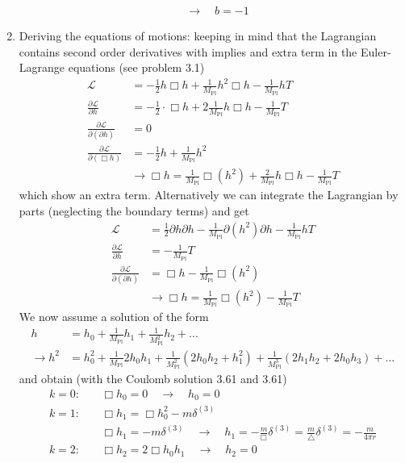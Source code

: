 \documentclass[10pt,a4paper]{book}
\theoremstyle{definition}
\begin{document}
\begin{enumerate}[label=(\alph*)]
\begin{align}
&\rightarrow\quad b=-1
\end{align} 
\item Deriving the equations of motions: keeping in mind that the Lagrangian contains second order derivatives with implies and extra term in the Euler-Lagrange equations (see problem 3.1)
\begin{align}
\mathcal{L}&=-\frac{1}{2}h\Box h+\frac{1}{M_\text{Pl}}h^2\Box h-\frac{1}{M_\text{Pl}}hT\\
\frac{\partial\mathcal{L}}{\partial h}&=-\frac{1}{2}\cdot\Box h+2\frac{1}{M_\text{Pl}}h\Box h-\frac{1}{M_\text{Pl}}T\\
\frac{\partial\mathcal{L}}{\partial(\partial h)}&=0\\
\frac{\partial\mathcal{L}}{\partial(\Box h)}&=-\frac{1}{2}h+\frac{1}{M_\text{Pl}}h^2\\
&\rightarrow\Box h=\frac{1}{M_\text{Pl}}\Box(h^2)+\frac{2}{M_\text{Pl}}h\Box h-\frac{1}{M_\text{Pl}}T
\end{align}
which show an extra term. Alternatively we can integrate the Lagrangian by parts (neglecting the boundary terms) and get
\begin{align}
\mathcal{L}&=\frac{1}{2}\partial h\partial h-\frac{1}{M_\text{Pl}}\partial(h^2)\partial h-\frac{1}{M_\text{Pl}}hT\\
\frac{\partial\mathcal{L}}{\partial h}&=-\frac{1}{M_\text{Pl}}T\\
\frac{\partial\mathcal{L}}{\partial(\partial h)}&=\Box h-\frac{1}{M_\text{Pl}}\Box(h^2)\\
&\rightarrow\Box h=\frac{1}{M_\text{Pl}}\Box(h^2)-\frac{1}{M_\text{Pl}}T
\end{align}
We now assume a solution of the form
\begin{align}
h&=h_0+\frac{1}{M_\text{Pl}}h_1+\frac{1}{M_\text{Pl}^2}h_2+...\\
\rightarrow h^2&=h_0^2+\frac{1}{M_\text{Pl}}2h_0h_1+\frac{1}{M_\text{Pl}^2}(2h_0h_2+h_1^2)+\frac{1}{M_\text{Pl}^3}(2h_1h_2+2h_0h_3)+...
\end{align}
and obtain (with the Coulomb solution 3.61 and 3.61)
\begin{align}
k=0:&\quad\Box h_0=0\quad\rightarrow\quad h_0=0\\
k=1:&\quad\Box h_1=\Box h_0^2-m\delta^{(3)}\\
    &\quad\Box h_1=-m\delta^{(3)}\quad\rightarrow\quad h_1=-\frac{m}{\Box}\delta^{(3)}=\frac{m}{\triangle}\delta^{(3)}=-\frac{m}{4\pi r}\\
k=2:&\quad\Box h_2=2\Box h_0h_1\quad\rightarrow\quad h_2=0\\

\end{align}
\end{enumerate}
\end{document}
